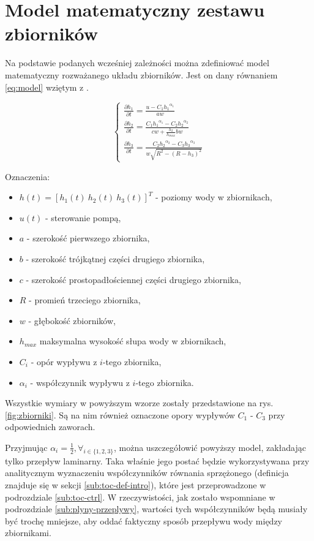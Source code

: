 \section{Model matematyczny zestawu zbiorników}
\label{sec:model}

Na podstawie podanych wcześniej zależności można zdefiniować model matematyczny rozważanego układu zbiorników.
Jest on dany równaniem \ref{eq:model} wziętym z \cite{TanksManual}.

\begin{equation}\label{eq:model}
\left \{
\begin{array}{lr}
\frac{\partial h_{1}}{\partial t} = \frac{u - C_{1}{h_{1}}^{\alpha_{1}}}{aw} \\[8pt]
\frac{\partial h_{2}}{\partial t} = \frac{C_{1}{h_{1}}^{\alpha_{1}} -  C_{2}{h_{2}}^{\alpha_{2}}}{cw + \frac{h_{2}}{h_{max}}bw} \\[12pt]
\frac{\partial h_{3}}{\partial t} = \frac{C_{2}{h_{2}}^{\alpha_{2}} -  C_{3}{h_{3}}^{\alpha_{3}}}{w\sqrt{R^{2} - (R - h_{3})^{2}}}
\end{array}
\right.
\end{equation}

Oznaczenia:
\begin{itemize}
    \item $h(t) = [h_{1}(t)~ h_{2}(t)~ h_{3}(t)]^{T}$ - poziomy wody w zbiornikach,
    \item $u(t)$ - sterowanie pompą,
    \item $a$ - szerokość pierwszego zbiornika,
    \item $b$ - szerokość trójkątnej części drugiego zbiornika,
    \item $c$ - szerokość prostopadłościennej części drugiego zbiornika,
    \item $R$ - promień trzeciego zbiornika,
    \item $w$ - głębokość zbiorników,
    \item $h_{max}$ maksymalna wysokość słupa wody w zbiornikach,
    \item $C_{i}$ - opór wypływu z $i$-tego zbiornika,
    \item $\alpha_{i}$ - współczynnik wypływu z $i$-tego zbiornika.
\end{itemize}

Wszystkie wymiary w powyższym wzorze zostały przedstawione na rys. \ref{fig:zbiorniki}. Są na nim również oznaczone opory wypływów $C_{1}$ - $C_{3}$ przy odpowiednich zaworach.

Przyjmując $\alpha_{i} = \frac{1}{2}, \forall_{i \in \{1, 2, 3\}}$, można uszczegółowić powyższy model, zakładając tylko przepływ laminarny.
Taka właśnie jego postać będzie wykorzystywana przy analitycznym wyznaczeniu współczynników równania sprzężonego (definicja znajduje się w sekcji \ref{sub:toc-def-intro}), które jest przeprowadzone w podrozdziale \ref{sub:toc-ctrl}.
W rzeczywistości, jak zostało wspomniane w podrozdziale \ref{sub:plyny-przeplywy}, wartości tych współczynników będą musiały być trochę mniejsze, aby oddać faktyczny sposób przepływu wody między zbiornikami.

